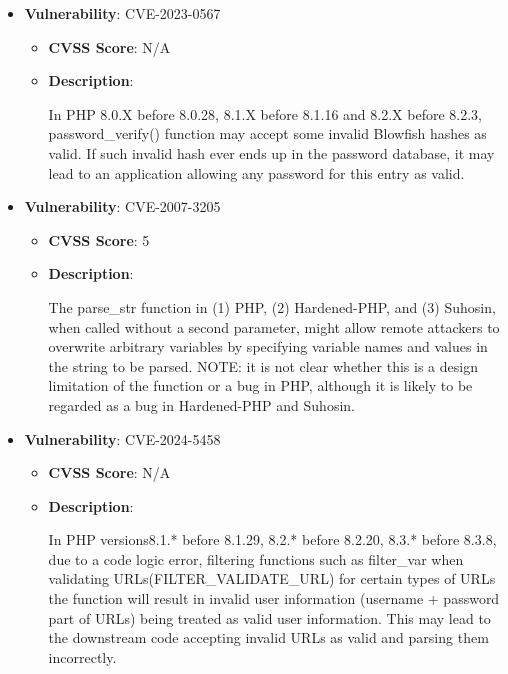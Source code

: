 \documentclass{article}
\begin{document}
\begin{itemize}
        \item \textbf{Vulnerability}: CVE-2023-0567
        \begin{itemize}
            \item \textbf{CVSS Score}:  N/A 
            \item \textbf{Description}:
            \parbox[t]{0.9\linewidth}{
                \ttfamily In PHP 8.0.X before 8.0.28, 8.1.X before 8.1.16 and 8.2.X before 8.2.3, password\_verify() function may accept some invalid Blowfish hashes as valid. If such invalid hash ever ends up in the password database, it may lead to an application allowing any password for this entry as valid.
            }
        \end{itemize}
    
        \item \textbf{Vulnerability}: CVE-2007-3205
        \begin{itemize}
            \item \textbf{CVSS Score}:  5 
            \item \textbf{Description}:
            \parbox[t]{0.9\linewidth}{
                \ttfamily The parse\_str function in (1) PHP, (2) Hardened-PHP, and (3) Suhosin, when called without a second parameter, might allow remote attackers to overwrite arbitrary variables by specifying variable names and values in the string to be parsed.  NOTE: it is not clear whether this is a design limitation of the function or a bug in PHP, although it is likely to be regarded as a bug in Hardened-PHP and Suhosin.
            }
        \end{itemize}
    
        \item \textbf{Vulnerability}: CVE-2024-5458
        \begin{itemize}
            \item \textbf{CVSS Score}:  N/A 
            \item \textbf{Description}:
            \parbox[t]{0.9\linewidth}{
                \ttfamily In PHP versions8.1.* before 8.1.29, 8.2.* before 8.2.20, 8.3.* before 8.3.8, due to a code logic error, filtering functions such as filter\_var when validating URLs(FILTER\_VALIDATE\_URL) for certain types of URLs the function will result in invalid user information (username + password part of URLs) being treated as valid user information. This may lead to the downstream code accepting invalid URLs as valid and parsing them incorrectly.
            }
        \end{itemize}
    
\end{itemize}
\end{document}
